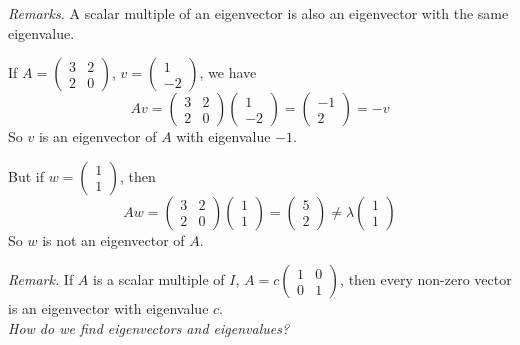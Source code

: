 \documentclass[10pt]{scrartcl}
\begin{document}
\emph{Remarks.} A scalar multiple of an eigenvector is also an eigenvector with the same eigenvalue.\\

\begin{example}
If $A = \begin{pmatrix}
 3 & 2 \\ 2 & 0	
 \end{pmatrix}$, $v = \begin{pmatrix}
1 \\ -2	
\end{pmatrix}$, we have 
\[
  Av = \begin{pmatrix}
 3 & 2 \\ 2 & 0	
 \end{pmatrix}\begin{pmatrix}
1 \\ -2	
\end{pmatrix} = \begin{pmatrix}
-1 \\ 2	
\end{pmatrix} = -v
\]
So $v$ is an eigenvector of $A$ with eigenvalue $-1$. 

But if $w = \begin{pmatrix}
 1 \\ 1	
 \end{pmatrix}$, then 
 \[
  Aw = \begin{pmatrix}
 3 & 2\\ 2 & 0 	
 \end{pmatrix}\begin{pmatrix}
 1 \\ 1	
 \end{pmatrix} = \begin{pmatrix}
 5\\ 2	
 \end{pmatrix} \neq \lambda\begin{pmatrix}
1 \\ 1	
\end{pmatrix}
\]
So $w$ is not an eigenvector of $A$.
\end{example}\vsp

\emph{Remark.} If $A$ is a scalar multiple of $I$, $A = c\begin{pmatrix}
 1 & 0\\ 0 & 1	
 \end{pmatrix}$, then every non-zero vector is an eigenvector with eigenvalue $c$.\\
 
 \emph{How do we find eigenvectors and eigenvalues?}
 
\end{document}
